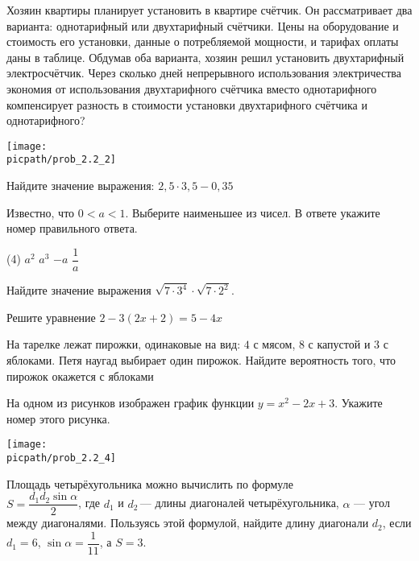 \begin{training}[1]
\begin{listofex}
			Хозяин квартиры планирует установить в квартире счётчик. Он рассматривает два варианта: однотарифный или двухтарифный счётчики. Цены на оборудование и стоимость его установки, данные о потребляемой мощности, и тарифах оплаты даны в таблице.
			Обдумав оба варианта, хозяин решил установить двухтарифный электросчётчик. Через сколько дней непрерывного использования электричества экономия от использования двухтарифного счётчика вместо однотарифного компенсирует разность в стоимости установки двухтарифного счётчика и однотарифного?
			\foranswer
		\gapwidth
		\begin{center}
			\texttt{[image: \\picpath/prob\_2.2\_2]}
		\end{center}
		\item Найдите значение выражения: \( 2,5\cdot3,5-0,35 \)
		\foranswer
		\item Известно, что \( 0<a<1 \). Выберите наименьшее из чисел. В ответе укажите номер правильного ответа.
		\begin{tasks}(4)
			\task \( a^2 \)
			\task \( a^3 \)
			\task \( -a \)
			\task \( \dfrac{1}{a} \)
		\end{tasks}
		\foranswer
		\item Найдите значение выражения \( \sqrt{7\cdot3^4}\cdot\sqrt{7\cdot2^2} \).
		\foranswer
		\item Решите уравнение \(2-3(2x+2)=5-4x\)
		\foranswer
		\hphantom{Часть 1}
		\item На  тарелке  лежат  пирожки,  одинаковые  на  вид:  \(4\)  с  мясом,  \(8\)  с  капустой  и \(3\) с яблоками. Петя наугад выбирает один пирожок. Найдите вероятность того, что пирожок окажется с яблоками
		\foranswer
		\item На одном из рисунков изображен график функции \( y=x^2-2x+3 \). Укажите номер этого рисунка.
		\begin{center}
			\texttt{[image: \\picpath/prob\_2.2\_4]}
		\end{center}
		\foranswer
		\item Площадь четырёхугольника можно вычислить по формуле \\ \( S=\dfrac{d_1d_2\sin\alpha}{2} \),  где \( d_1 \) и \( d_2 \) --- длины диагоналей четырёхугольника, \( \alpha \) --- угол между диагоналями. Пользуясь этой формулой, найдите длину диагонали \( d_2 \), если \( d_1=6 \), \( \sin\alpha=\dfrac{1}{11} \), а \( S=3 \).
		\foranswer
			\end{listofex}
		\newpage
		\begin{listofex}[resume]

\end{listofex}
\end{training}
